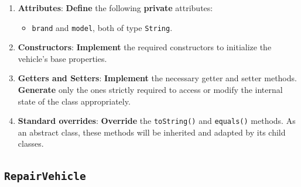 \begin{enumerate}

    \item \textbf{Attributes}: \textbf{Define} the following \textbf{private} attributes:

        \begin{itemize}

            \item \texttt{brand} and \texttt{model}, both of type \texttt{String}.

        \end{itemize}

    \item \textbf{Constructors}: \textbf{Implement} the required constructors to initialize the vehicle's base properties.

    \item \textbf{Getters and Setters}: \textbf{Implement} the necessary getter and setter methods. \textbf{Generate} only the ones strictly required to access or modify the internal state of the class appropriately.

    \item \textbf{Standard overrides}: \textbf{Override} the \texttt{toString()} and \texttt{equals()} methods. As an abstract class, these methods will be inherited and adapted by its child classes.

\end{enumerate}

\subsection{\texttt{RepairVehicle}}

